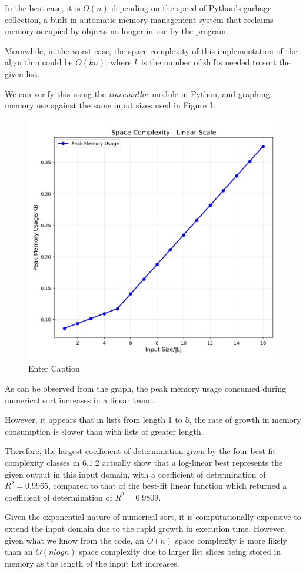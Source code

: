 \documentclass[12pt]{article}
\begin{document}
In the best case, it is $O(n)$ depending on the speed of Python's garbage collection, a built-in automatic memory management system that reclaims memory occupied by objects no longer in use by the program.

Meanwhile, in the worst case, the space complexity of this implementation of the algorithm could be $O(kn)$, where $k$ is the number of shifts needed to sort the given list.

We can verify this using the \emph{tracemalloc} module in Python, and graphing memory use against the same input sizes used in Figure 1.

\begin{figure}[H]
    \centering
    \includegraphics[width=0.75\linewidth]{Space_Complexity.png}
    \caption{Enter Caption}
    \label{fig:placeholder}
\end{figure}

As can be observed from the graph, the peak memory usage consumed during numerical sort increases in a linear trend.

However, it appears that in lists from length 1 to 5, the rate of growth in memory consumption is slower than with lists of greater length.

Therefore, the largest coefficient of determination given by the four best-fit complexity classes in 6.1.2 actually show that a log-linear best represents the given output in this input domain, with a coefficient of determination of $R^2=0.9965$, compared to that of the best-fit linear function which returned a coefficient of determination of $R^2=0.9809$.

Given the exponential nature of numerical sort, it is computationally expensive to extend the input domain due to the rapid growth in execution time. However, given what we know from the code, an $O(n)$ space complexity is more likely than an $O(nlogn)$ space complexity due to larger list slices being stored in memory as the length of the input list increases.
\end{document}
